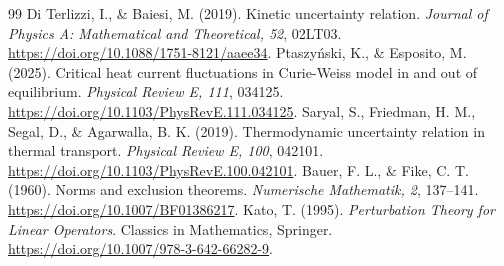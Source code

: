 \documentclass[11pt,a4paper]{article}
\theoremstyle{remark}\newtheorem{remark}[theorem]{Remark}
\begin{document}
\begin{thebibliography}{99}
 Di Terlizzi, I., \& Baiesi, M. (2019). Kinetic uncertainty relation. \emph{Journal of Physics A: Mathematical and Theoretical, 52}, 02LT03. \url{https://doi.org/10.1088/1751-8121/aaee34}.
 Ptaszy\'nski, K., \& Esposito, M. (2025). Critical heat current fluctuations in Curie-Weiss model in and out of equilibrium. \emph{Physical Review E, 111}, 034125. \url{https://doi.org/10.1103/PhysRevE.111.034125}.
 Saryal, S., Friedman, H. M., Segal, D., \& Agarwalla, B. K. (2019). Thermodynamic uncertainty relation in thermal transport. \emph{Physical Review E, 100}, 042101. \url{https://doi.org/10.1103/PhysRevE.100.042101}.
 Bauer, F. L., \& Fike, C. T. (1960). Norms and exclusion theorems. \emph{Numerische Mathematik, 2}, 137--141. \url{https://doi.org/10.1007/BF01386217}.
 Kato, T. (1995). \emph{Perturbation Theory for Linear Operators}. Classics in Mathematics, Springer. \url{https://doi.org/10.1007/978-3-642-66282-9}.
\end{thebibliography}
\endgroup
\end{document}
